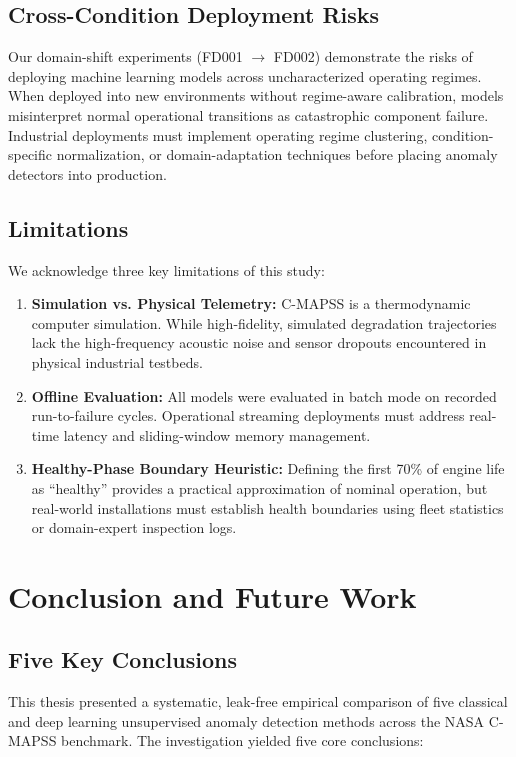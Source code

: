 \documentclass[12pt,a4paper,oneside]{report}
\begin{document}
\section{Cross-Condition Deployment Risks}
Our domain-shift experiments (FD001 $\rightarrow$ FD002) demonstrate the risks of deploying machine learning models across uncharacterized operating regimes. When deployed into new environments without regime-aware calibration, models misinterpret normal operational transitions as catastrophic component failure. Industrial deployments must implement operating regime clustering, condition-specific normalization, or domain-adaptation techniques before placing anomaly detectors into production.

\section{Limitations}
We acknowledge three key limitations of this study:
\begin{enumerate}
    \item \textbf{Simulation vs. Physical Telemetry:} C-MAPSS is a thermodynamic computer simulation. While high-fidelity, simulated degradation trajectories lack the high-frequency acoustic noise and sensor dropouts encountered in physical industrial testbeds.
    \item \textbf{Offline Evaluation:} All models were evaluated in batch mode on recorded run-to-failure cycles. Operational streaming deployments must address real-time latency and sliding-window memory management.
    \item \textbf{Healthy-Phase Boundary Heuristic:} Defining the first 70\% of engine life as ``healthy'' provides a practical approximation of nominal operation, but real-world installations must establish health boundaries using fleet statistics or domain-expert inspection logs.
\end{enumerate}

\chapter{Conclusion and Future Work}

\section{Five Key Conclusions}
This thesis presented a systematic, leak-free empirical comparison of five classical and deep learning unsupervised anomaly detection methods across the NASA C-MAPSS benchmark. The investigation yielded five core conclusions:
\end{document}
